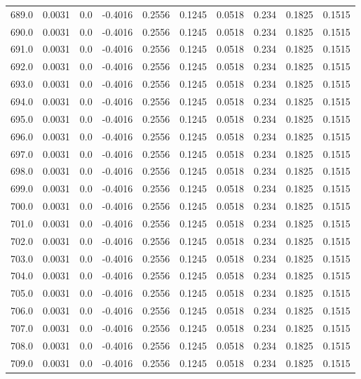 \begin{longtable}{lrrrrrrrrr}
689.0 & 0.0031 & 0.0 & -0.4016 & 0.2556 & 0.1245 & 0.0518 & 0.234 & 0.1825 & 0.1515 \\
690.0 & 0.0031 & 0.0 & -0.4016 & 0.2556 & 0.1245 & 0.0518 & 0.234 & 0.1825 & 0.1515 \\
691.0 & 0.0031 & 0.0 & -0.4016 & 0.2556 & 0.1245 & 0.0518 & 0.234 & 0.1825 & 0.1515 \\
692.0 & 0.0031 & 0.0 & -0.4016 & 0.2556 & 0.1245 & 0.0518 & 0.234 & 0.1825 & 0.1515 \\
693.0 & 0.0031 & 0.0 & -0.4016 & 0.2556 & 0.1245 & 0.0518 & 0.234 & 0.1825 & 0.1515 \\
694.0 & 0.0031 & 0.0 & -0.4016 & 0.2556 & 0.1245 & 0.0518 & 0.234 & 0.1825 & 0.1515 \\
695.0 & 0.0031 & 0.0 & -0.4016 & 0.2556 & 0.1245 & 0.0518 & 0.234 & 0.1825 & 0.1515 \\
696.0 & 0.0031 & 0.0 & -0.4016 & 0.2556 & 0.1245 & 0.0518 & 0.234 & 0.1825 & 0.1515 \\
697.0 & 0.0031 & 0.0 & -0.4016 & 0.2556 & 0.1245 & 0.0518 & 0.234 & 0.1825 & 0.1515 \\
698.0 & 0.0031 & 0.0 & -0.4016 & 0.2556 & 0.1245 & 0.0518 & 0.234 & 0.1825 & 0.1515 \\
699.0 & 0.0031 & 0.0 & -0.4016 & 0.2556 & 0.1245 & 0.0518 & 0.234 & 0.1825 & 0.1515 \\
700.0 & 0.0031 & 0.0 & -0.4016 & 0.2556 & 0.1245 & 0.0518 & 0.234 & 0.1825 & 0.1515 \\
701.0 & 0.0031 & 0.0 & -0.4016 & 0.2556 & 0.1245 & 0.0518 & 0.234 & 0.1825 & 0.1515 \\
702.0 & 0.0031 & 0.0 & -0.4016 & 0.2556 & 0.1245 & 0.0518 & 0.234 & 0.1825 & 0.1515 \\
703.0 & 0.0031 & 0.0 & -0.4016 & 0.2556 & 0.1245 & 0.0518 & 0.234 & 0.1825 & 0.1515 \\
704.0 & 0.0031 & 0.0 & -0.4016 & 0.2556 & 0.1245 & 0.0518 & 0.234 & 0.1825 & 0.1515 \\
705.0 & 0.0031 & 0.0 & -0.4016 & 0.2556 & 0.1245 & 0.0518 & 0.234 & 0.1825 & 0.1515 \\
706.0 & 0.0031 & 0.0 & -0.4016 & 0.2556 & 0.1245 & 0.0518 & 0.234 & 0.1825 & 0.1515 \\
707.0 & 0.0031 & 0.0 & -0.4016 & 0.2556 & 0.1245 & 0.0518 & 0.234 & 0.1825 & 0.1515 \\
708.0 & 0.0031 & 0.0 & -0.4016 & 0.2556 & 0.1245 & 0.0518 & 0.234 & 0.1825 & 0.1515 \\
709.0 & 0.0031 & 0.0 & -0.4016 & 0.2556 & 0.1245 & 0.0518 & 0.234 & 0.1825 & 0.1515 \\

\end{longtable}
